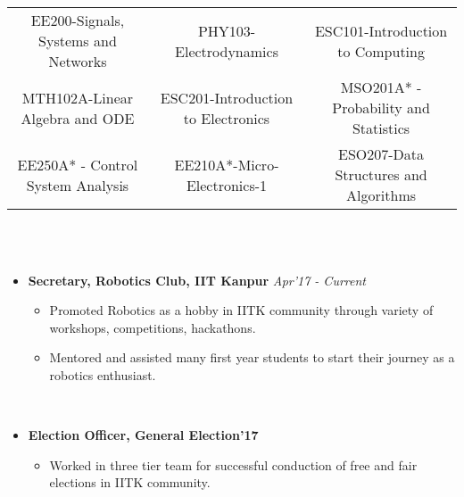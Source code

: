 \\[\lsep] \\ \\
\begin{center} \\[-0.5cm]
\begin{tabular}{|c|c|c|}
    \hline \vspace{.05cm}
     EE200-Signals, Systems and Networks  & PHY103-Electrodynamics & ESC101-Introduction to Computing \\ \vspace{.05cm}
     MTH102A-Linear Algebra and ODE & ESC201-Introduction to Electronics & MSO201A* - Probability and Statistics \\ \vspace{.05cm}
     EE250A* - Control System Analysis & EE210A*-Micro-Electronics-1 & ESO207-Data Structures and Algorithms \\ \hline
\end{tabular}
\end{center}
\\
\\[\lsep]
\begin{itemize}
\item \noindent \textbf{Secretary, Robotics Club, IIT Kanpur} \hfill \textit{Apr'17 - Current}\\ \vspace{-.1cm}
    \begin{itemize}\itemsep \isep
        \item Promoted Robotics as a hobby in IITK community through variety of workshops, competitions, hackathons.
        \item Mentored and assisted many first year students to start their journey as a robotics enthusiast.
    \end{itemize}\\ \vspace{-.1cm}
\item \noindent \textbf{Election Officer, General Election’17}\\ \vspace{-.2cm}
    \begin{itemize} \itemsep \isep
        \item Worked in three tier team for successful conduction of free and fair elections in IITK community.
    \end{itemize}
\end{itemize}
